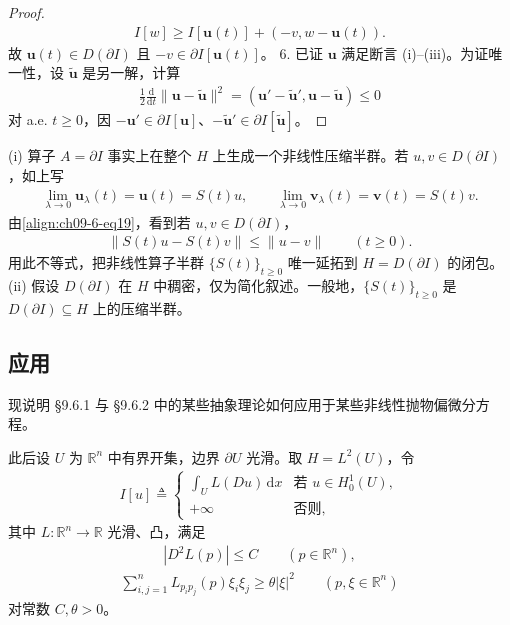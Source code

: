 \documentclass[../../main.tex]{subfiles}
\begin{document}
\begin{theorem}[梯度流的解]
\begin{proof}
\begin{align*}
I[w]\geqslant I[\mathbf{u}(t)]+(-v,w-\mathbf{u}(t)).
\end{align*}
故 $\mathbf{u}(t)\in D(\partial I)$ 且 $-v\in\partial I[\mathbf{u}(t)]$。
6. 已证 $\mathbf{u}$ 满足断言 (i)--(iii)。为证唯一性，设 $\widetilde{\mathbf{u}}$ 是另一解，计算
\begin{align*}
\frac12\frac{\mathrm{d}}{\mathrm{d}t}\|\mathbf{u}-\widetilde{\mathbf{u}}\|^2=(\mathbf{u}'-\widetilde{\mathbf{u}}',\mathbf{u}-\widetilde{\mathbf{u}})\leqslant 0
\end{align*}
对 a.e. $t\geqslant 0$，因 $-\mathbf{u}'\in\partial I[\mathbf{u}]$、$-\widetilde{\mathbf{u}}'\in\partial I[\widetilde{\mathbf{u}}]$。
\end{proof}
\end{theorem}

\begin{remark}
(i) 算子 $A=\partial I$ 事实上在整个 $H$ 上生成一个非线性压缩半群。若 $u,v\in D(\partial I)$，如上写
\begin{align*}
\lim_{\lambda\to 0}\mathbf{u}_\lambda(t)=\mathbf{u}(t)=S(t)u,\qquad \lim_{\lambda\to 0}\mathbf{v}_\lambda(t)=\mathbf{v}(t)=S(t)v.
\end{align*}
由\eqref{align:ch09-6-eq19}，看到若 $u,v\in D(\partial I)$，
\begin{align*}
\|S(t)u-S(t)v\|\leqslant\|u-v\|\qquad (t\geqslant 0).
\end{align*}
用此不等式，把非线性算子半群 $\{S(t)\}_{t\geqslant 0}$ 唯一延拓到 $H=D(\partial I)$ 的闭包。
(ii) 假设 $D(\partial I)$ 在 $H$ 中稠密，仅为简化叙述。一般地，$\{S(t)\}_{t\geqslant 0}$ 是 $D(\partial I)\subseteq H$ 上的压缩半群。
\end{remark}

\subsection{应用}\label{subsection:ch09-6-3-应用}

现说明 \S9.6.1 与 \S9.6.2 中的某些抽象理论如何应用于某些非线性抛物偏微分方程。

此后设 $U$ 为 $\mathbb{R}^n$ 中有界开集，边界 $\partial U$ 光滑。取 $H=L^2(U)$，令
\begin{align}
I[u]\triangleq\begin{cases}\int_U L(Du)\,\mathrm{d}x&\text{若 }u\in H_0^1(U),\\ +\infty&\text{否则},\end{cases}\label{align:ch09-6-eq27}
\end{align}
其中 $L:\mathbb{R}^n\to\mathbb{R}$ 光滑、凸，满足
\begin{align}
|D^2L(p)|\leqslant C\qquad (p\in\mathbb{R}^n),\label{align:ch09-6-eq28}
\end{align}
\begin{align}
\sum_{i,j=1}^n L_{p_ip_j}(p)\xi_i\xi_j\geqslant\theta|\xi|^2\qquad (p,\xi\in\mathbb{R}^n)\label{align:ch09-6-eq29}
\end{align}
对常数 $C,\theta>0$。
\end{document}
